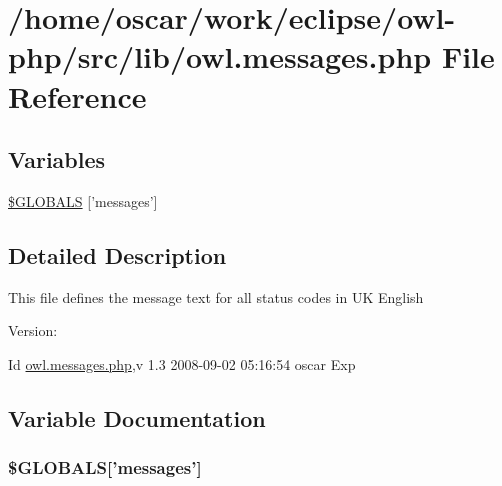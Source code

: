 \hypertarget{owl_8messages_8php}{
\section{/home/oscar/work/eclipse/owl-php/src/lib/owl.messages.php File Reference}
\label{owl_8messages_8php}
}
\subsection*{Variables}
\begin{CompactItemize}
\item 
\hyperlink{owl_8messages_8php_65f2996116eed36e9ab25f254a470259}{\$GLOBALS} \mbox{[}'messages'\mbox{]}
\end{CompactItemize}


\subsection{Detailed Description}
This file defines the message text for all status codes in UK English \begin{Desc}
\item[Version:]\end{Desc}
\begin{Desc}
\item[Id]\hyperlink{owl_8messages_8php}{owl.messages.php},v 1.3 2008-09-02 05:16:54 oscar Exp \end{Desc}


\subsection{Variable Documentation}
\hypertarget{owl_8messages_8php_65f2996116eed36e9ab25f254a470259}{
\subsubsection{\setlength{\rightskip}{0pt plus 5cm}\$GLOBALS\mbox{[}'messages'\mbox{]}}}
\label{owl_8messages_8php_65f2996116eed36e9ab25f254a470259}


